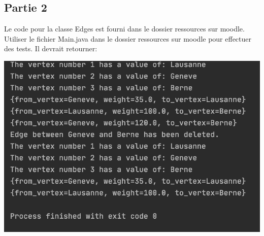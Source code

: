 \subsection{Partie 2}
Le code pour la classe Edges est fourni dans le dossier ressources sur moodle.
Utiliser le fichier Main.java dans le dossier ressources sur moodle pour effectuer des tests. Il devrait retourner:

\includegraphics[]{sortie_juste.PNG}
